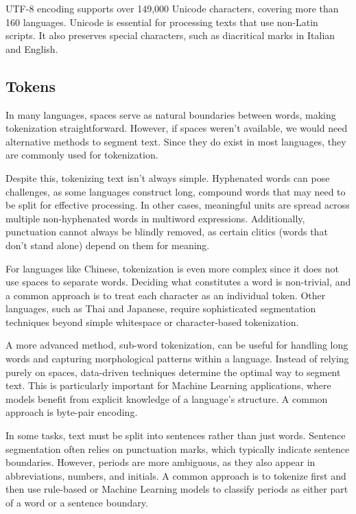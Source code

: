 UTF-8 encoding supports over 149,000 Unicode characters, covering more than 160 languages. 
Unicode is essential for processing texts that use non-Latin scripts. 
It also preserves special characters, such as diacritical marks in Italian and English.

\subsection{Tokens}
In many languages, spaces serve as natural boundaries between words, making tokenization straightforward. 
However, if spaces weren't available, we would need alternative methods to segment text. 
Since they do exist in most languages, they are commonly used for tokenization.

Despite this, tokenizing text isn't always simple. 
Hyphenated words can pose challenges, as some languages construct long, compound words that may need to be split for effective processing. 
In other cases, meaningful units are spread across multiple non-hyphenated words in multiword expressions. 
Additionally, punctuation cannot always be blindly removed, as certain clitics (words that don't stand alone) depend on them for meaning.

For languages like Chinese, tokenization is even more complex since it does not use spaces to separate words.
Deciding what constitutes a word is non-trivial, and a common approach is to treat each character as an individual token.
Other languages, such as Thai and Japanese, require sophisticated segmentation techniques beyond simple whitespace or character-based tokenization.

A more advanced method, sub-word tokenization, can be useful for handling long words and capturing morphological patterns within a language. 
Instead of relying purely on spaces, data-driven techniques determine the optimal way to segment text. 
This is particularly important for Machine Learning applications, where models benefit from explicit knowledge of a language's structure. 
A common approach is byte-pair encoding.

In some tasks, text must be split into sentences rather than just words. 
Sentence segmentation often relies on punctuation marks, which typically indicate sentence boundaries.
However, periods are more ambiguous, as they also appear in abbreviations, numbers, and initials. 
A common approach is to tokenize first and then use rule-based or Machine Learning models to classify periods as either part of a word or a sentence boundary.

